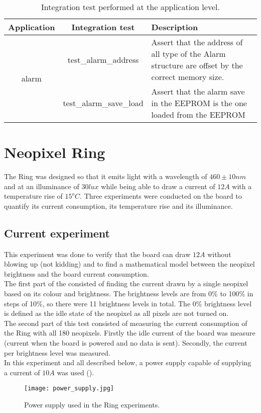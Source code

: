 \begin{table}[h!]
	\centering
	\caption{Integration test performed at the application level.}
	\label{table:integrationTest}
	\begin{tabular}{ccp{18em}}
		\hline
		\toprule
		\textbf{Application} & \textbf{Integration test} & \textbf{Description}\\
		\bottomrule
		\toprule
		\multirow{6}{*}{alarm} & test\_alarm\_address & Assert that the address of all type of the Alarm structure are offset by the correct memory size.\\
		& test\_alarm\_save\_load & Assert that the alarm save in the EEPROM is the one loaded from the EEPROM\\ 
		\bottomrule
		\hline
	\end{tabular}
\end{table}

\section{Neopixel Ring}
The Ring was designed so that it emits light with a wavelength of $460\pm 10nm$ and at an illuminance of  $30lux$ while being able to draw a current of $12A$ with a temperature rise of $15^oC$. Three experiments were conducted on the board to quantify its current consumption, its temperature rise and its illuminance.  

\subsection{Current experiment}
This experiment was done to verify that the board can draw $12A$ without blowing up (not kidding) and to find a mathematical model between the neopixel brightness and the board current consumption.\\
The first part of the consisted of finding the current drawn by a single neopixel based on its colour and brightness. The brightness levels are from 0\% to 100\% in steps of 10\%, so there were 11 brightness levels in total. The 0\% brightness level is defined as the idle state of the neopixel as all pixels are not turned on.\\
The second part of this test consisted of measuring the current consumption of the Ring with all 180 neopixels. Firstly the idle current of the board was measure (current when the board is powered and no data is sent). Secondly, the current per brightness level was measured.\\
In this experiment and all described below, a power supply capable of supplying a current of $10A$ was used ().
\begin{figure}[ht]
	\centering
	\texttt{[image: power\_supply.jpg]}
	\caption{Power supply used in the Ring experiments.}
	\label{fig:power_supply}
\end{figure}
